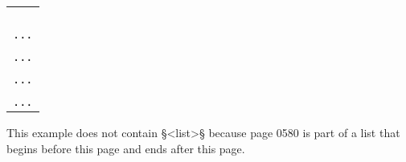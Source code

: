 \documentclass[fontsize=11pt, paper=a4, 
DIV15,
headings=normal,
parskip=half-, 
numbers=noenddot]{scrartcl}
\makeatletter
\newenvironment{typeChineseSmall}{\begin{alltt}\footnotesize\begin{tabular}{@{}l}}{\end{tabular}\end{alltt}}
\newcommand{\chin}[1]{{\fontspec{Sun-ExtA}{#1}}}
\newcommand{\f}[1]{\bold{#1}} %
\newcommand{\z}[1]{\chin{#1}} %
\newcommand{\smlb}{\bold{\textbackslash\textbackslash}}
\makeatother
\begin{document}
\newpage
\begin{example}[: page 0580]

\vspace{-5mm}
\begin{typeChineseSmall}
\bold{<pb a [}\chin{五六〇}\bold{]>} \\
\z{劉石潭易傳撮要}\f{<sm>}\z{一卷}\f{</sm>}\z{　}\f{<sm>}\z{劉髦}\smlb\z{見本集}\f{</sm>} \\
\z{張文定公易說}\f{<sm>}\z{一卷}\f{</sm>}\z{　}\f{<sm>}\z{張邦竒}\smlb\z{見本集}\f{</sm>} \\
\z{羅念菴易觧}\f{<sm>}\z{一}\smlb\z{卷}\f{</sm>}\z{　}\f{<sm>}\z{羅洪先}\smlb\z{見本載}\f{</sm>}\z{升庵易觧}\f{<sm>}\z{一卷}\f{</sm>}\z{　}\f{<sm>}\z{楊慎}\smlb\z{見餘苑}\f{</sm>} \\
... \\
\bold{<pb b>} \\
... \\
\bold{<pb c>} \\
... \\
\bold{<pb d>} \\
... \\
\end{typeChineseSmall}

\end{example}

\vspace{-3mm}
\begin{note}
This example does not contain §<list>§ because page 0580 is part of a list that begins before this page and ends after this page.
\end{note}




\end{document}
